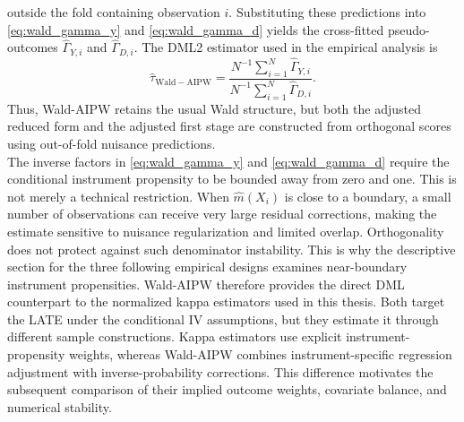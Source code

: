 \documentclass[12pt, a4paper, oneside]{article}
\theoremstyle{plain}
\theoremstyle{definition}
\begin{document}
outside the fold containing observation \(i\). Substituting these predictions
into \eqref{eq:wald_gamma_y} and \eqref{eq:wald_gamma_d} yields the
cross-fitted pseudo-outcomes \(\widehat\Gamma_{Y,i}\) and
\(\widehat\Gamma_{D,i}\). The DML2 estimator used in the empirical analysis is
\begin{equation}
    \widehat\tau_{\mathrm{Wald-AIPW}}
    =
    \frac{N^{-1}\sum_{i=1}^N\widehat\Gamma_{Y,i}}
         {N^{-1}\sum_{i=1}^N\widehat\Gamma_{D,i}}.
    \label{eq:wald_aipw_estimator}
\end{equation}
Thus, Wald-AIPW retains the usual Wald structure, but both the adjusted reduced
form and the adjusted first stage are constructed from orthogonal scores using
out-of-fold nuisance predictions.\\
The inverse factors in \eqref{eq:wald_gamma_y} and
\eqref{eq:wald_gamma_d} require the conditional instrument propensity to be
bounded away from zero and one. This is not merely a technical restriction.
When $\widehat m(X_i)$ is close to a boundary, a small number of observations
can receive very large residual corrections, making the estimate sensitive to
nuisance regularization and limited overlap. Orthogonality does not protect
against such denominator instability. This is why the descriptive section for the three following empirical designs
examines near-boundary instrument propensities.
Wald-AIPW therefore provides the direct DML counterpart to the normalized
kappa estimators used in this thesis. Both target the LATE under the conditional
IV assumptions, but they estimate it through different sample constructions.
Kappa estimators use explicit instrument-propensity weights, whereas
Wald-AIPW combines instrument-specific regression adjustment with
inverse-probability corrections. This difference motivates the subsequent
comparison of their implied outcome weights, covariate balance, and numerical
stability.
\end{document}
